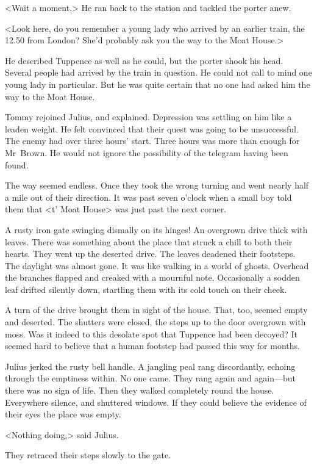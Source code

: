 <Wait a moment.> He ran back to the station and tackled the porter anew.

<Look here, do you remember a young lady who arrived by an earlier train, the 12.50 from London? She'd probably ask you the way to the Moat House.>

He described Tuppence as well as he could, but the porter shook his head. Several people had arrived by the train in question. He could not call to mind one young lady in particular. But he was quite certain that no one had asked him the way to the Moat House.

Tommy rejoined Julius, and explained. Depression was settling on him like a leaden weight. He felt convinced that their quest was going to be unsuccessful. The enemy had over three hours' start. Three hours was more than enough for Mr~Brown. He would not ignore the possibility of the telegram having been found.

The way seemed endless. Once they took the wrong turning and went nearly half a mile out of their direction. It was past seven o'clock when a small boy told them that <t' Moat House> was just past the next corner.

A rusty iron gate swinging dismally on its hinges! An overgrown drive thick with leaves. There was something about the place that struck a chill to both their hearts. They went up the deserted drive. The leaves deadened their footsteps. The daylight was almost gone. It was like walking in a world of ghosts. Overhead the branches flapped and creaked with a mournful note. Occasionally a sodden leaf drifted silently down, startling them with its cold touch on their cheek.

A turn of the drive brought them in sight of the house. That, too, seemed empty and deserted. The shutters were closed, the steps up to the door overgrown with moss. Was it indeed to this desolate spot that Tuppence had been decoyed? It seemed hard to believe that a human footstep had passed this way for months.

Julius jerked the rusty bell handle. A jangling peal rang discordantly, echoing through the emptiness within. No one came. They rang again and again—but there was no sign of life. Then they walked completely round the house. Everywhere silence, and shuttered windows. If they could believe the evidence of their eyes the place was empty.

<Nothing doing,> said Julius.

They retraced their steps slowly to the gate.

